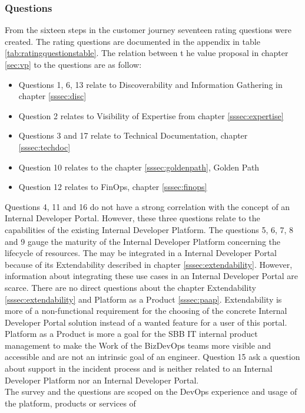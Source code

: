 \documentclass[a4paper,12pt]{article}
\begin{document}
    \subsubsection{Questions}
    From the sixteen steps in the customer journey seventeen rating questions were created.
    The rating questions are documented in the appendix in table \ref{tab:ratingquestionstable}.
    The relation between t he value proposal in chapter \ref{sec:vp} to the questions are as follow:
    \begin{itemize}
        \item Questions 1, 6, 13 relate to Discoverability and Information Gathering in chapter \ref{sssec:disc}
        \item Question 2 relates to Visibility of Expertise from chapter \ref{sssec:expertise}
        \item Questions 3 and 17 relate to Technical Documentation, chapter \ref{sssec:techdoc}
        \item Question 10 relates to the chapter \ref{sssec:goldenpath}, Golden Path
        \item Question 12 relates to FinOps, chapter \ref{sssec:finops}
    \end{itemize}
    Questions 4, 11 and 16 do not have a strong correlation with the concept of an Internal Developer Portal.
    However, these three questions relate to the capabilities of the existing Internal Developer Platform.
    The questions 5, 6, 7, 8 and 9 gauge the maturity of the Internal Developer Platform concerning the lifecycle of resources.
    The may be integrated in a Internal Developer Portal because of its Extendability described in chapter \ref{sssec:extendability}.
    However, information about integrating these use cases in an Internal Developer Portal are scarce.
    There are no direct questions about the chapter Extendability \ref{sssec:extendability} and Platform as a Product
    \ref{sssec:paap}.
    Extendability is more of a non-functional requirement for the choosing of the concrete Internal Developer Portal
    solution instead of a wanted feature for a user of this portal.
    Platform as a Product is more a goal for the SBB IT internal product management to make the Work of the BizDevOps
    teams more visible and accessible and are not an intrinsic goal of an engineer.
    Question 15 ask a question about support in the incident process and is neither related to an Internal Developer Platform
    nor an Internal Developer Portal. \\
    The survey and the questions are scoped on the DevOps experience and usage of the platform, products or services of
\end{document}
